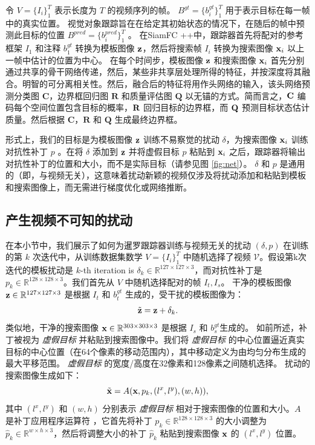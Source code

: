 令 $V=\{I_i\}_1^T$ 表示长度为 $T$ 的视频序列的帧。
$B^{gt}=\{b^{gt}_i\}_1^T$ 用于表示目标在每一帧中的真实位置。
视觉对象跟踪旨在在给定其初始状态的情况下，在随后的帧中预测此目标的位置 $B^{pred}=\{b^{pred}_i\}_1^T$ 。
在SiamFC ++中，跟踪器首先将配对的参考框架 $I_1$ 和注释 $b_1^{gt}$ 转换为模板图像 $\textbf z$，然后将搜索帧 $I_i$ 转换为搜索图像 $\textbf x_i$ 以上一帧中估计的位置为中心。
在每个时间步，模板图像 $\textbf z$ 和搜索图像 $\textbf x_i$ 首先分别通过共享的骨干网络传递，然后，某些非共享层处理所得的特征，并按深度将其融合。明智的可分离相关性。然后，融合后的特征将用作头网络的输入，该头网络预测分类图 $\textbf{C}$，边界框回归图 $\textbf{R}$ 和质量评估图 $\textbf{Q}$ 以无锚的方式。简而言之，$\textbf C$ 编码每个空间位置包含目标的概率，$\textbf R$ 回归目标的边界框，而 $\textbf Q$ 预测目标状态估计质量。然后根据 $\textbf{C}$，$\textbf{R}$ 和 $\textbf{Q}$ 生成最终边界框。

形式上，我们的目标是为模板图像 $\textbf z$ 训练不易察觉的扰动 $\delta$，为搜索图像 $\textbf x_i$ 训练对抗性补丁 $p$ 。在将 $\delta$ 添加到 $\textbf z$ 并将虚假目标 $p$ 粘贴到 $\textbf x_i$ 之后，跟踪器将输出对抗性补丁的位置和大小，而不是实际目标（请参见图 \ref{fig:net}）。
$\delta$ 和 $p$ 是通用的（即，与视频无关），这意味着扰动新颖的视频仅涉及将扰动添加和粘贴到模板和搜索图像上，而无需进行梯度优化或网络推断。

\subsection{产生视频不可知的扰动}

在本小节中，我们展示了如何为暹罗跟踪器训练与视频无关的扰动 $(\delta, p)$ 在训练的第 $k$ 次迭代中，从训练数据集数学 $V=\{I_i\}_1^T$ 中随机选择了视频 $\mathcal V$。假设第k次迭代的模板扰动是 $k$-th iteration is $\delta_k \in \mathbb{R}^{127\times 127 \times 3}$，而对抗性补丁是 $p_k \in \mathbb{R}^{128\times 128\times 3}$。我们首先从 $V$ 中随机选择配对的帧 $I_t, I_s$。
干净的模板图像 $\textbf z\in \mathbb{R}^{127\times 127 \times 3}$ 是根据 $I_t$ 和 $b^{gt}_t$ 生成的，受干扰的模板图像为：
\begin{equation}
\tilde {\textbf z} = \textbf z + \delta_k.
\end{equation}
类似地，干净的搜索图像 $\textbf x \in \mathbb{R}^{303\times 303 \times 3}$ 是根据 $I_s$ 和 $b^{gt}_s$生成的。
如前所述，补丁被视为 \textit{虚假目标} 并粘贴到搜索图像中。我们将 \textit{虚假目标} 的中心位置逼近真实目标的中心位置（在64个像素的移动范围内），其中移动定义为由均匀分布生成的最大平移范围。
\textit{虚假目标} 的宽度/高度在32像素和128像素之间随机选择。
扰动的搜索图像生成如下：
\begin{equation}
\tilde{\textbf x} = A(\textbf x, p_k, (l^x, l^y), (w, h)),
\end{equation}
其中 $(l^x, l^y)$ 和 $(w, h)$ 分别表示 \textit{虚假目标} 相对于搜索图像的位置和大小。$A$ 是补丁应用程序运算符 \cite{patch}，它首先将补丁 $p_k \in \mathbb{R}^{128\times 128\times 3}$ 的大小调整为 $\hat{p}_k \in \mathbb{R}^{w\times h\times 3}$，然后将调整大小的补丁 $\hat{p}_k$ 粘贴到搜索图像 $\textbf x$ 的 $(l^x,l^y)$ 位置。


